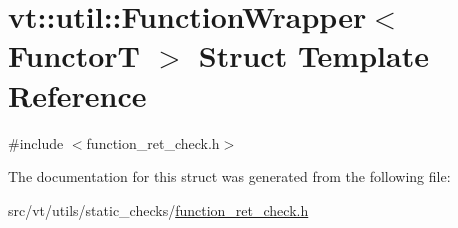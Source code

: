 \hypertarget{structvt_1_1util_1_1_function_wrapper}{}\section{vt\+:\+:util\+:\+:Function\+Wrapper$<$ FunctorT $>$ Struct Template Reference}
\label{structvt_1_1util_1_1_function_wrapper}


{\ttfamily \#include $<$function\+\_\+ret\+\_\+check.\+h$>$}



The documentation for this struct was generated from the following file\+:\begin{DoxyCompactItemize}
\item 
src/vt/utils/static\+\_\+checks/\hyperlink{function__ret__check_8h}{function\+\_\+ret\+\_\+check.\+h}\end{DoxyCompactItemize}
